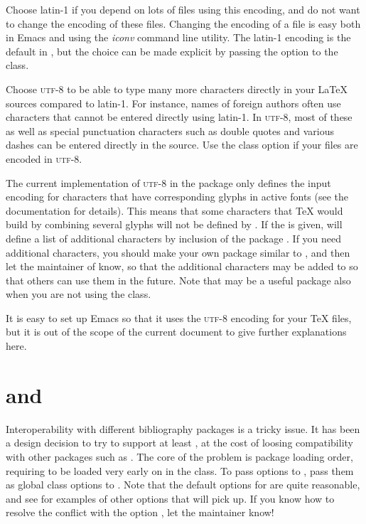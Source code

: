 Choose \mbox{latin-1} if you depend on lots of files using this encoding, and do not want to change the encoding of these files.  Changing the encoding of a file is easy both in Emacs and using the \emph{iconv} command line utility.  The \mbox{latin-1} encoding is the default in \rtthesis, but the choice can be made explicit by passing the  option to the class.

Choose \mbox{\textsc{utf}-8} to be able to type many more characters directly in your \LaTeX{} sources compared to \mbox{latin-1}.  For instance, names of foreign authors often use characters that cannot be entered directly using \mbox{latin-1}.  In \mbox{\textsc{utf}-8}, most of these as well as special punctuation characters such as double quotes and various dashes can be entered directly in the source.  Use the  class option if your files are encoded in \mbox{\textsc{utf}-8}.

The current implementation of \mbox{\textsc{utf}-8} in the  package only defines the input encoding for characters that have corresponding glyphs in active fonts (see the  documentation for details).  This means that some characters that \TeX{} would build by combining several glyphs will not be defined by .  If the  is given, \rtthesis will define a list of additional characters by inclusion of the package .  If you need additional characters, you should make your own package similar to , and then let the maintainer of \rtthesis know, so that the additional characters may be added to  so that others can use them in the future.  Note that  may be a useful package also when you are not using the \rtthesis class.

It is easy to set up Emacs so that it uses the \mbox{\textsc{utf}-8} encoding for your \TeX{} files, but it is out of the scope of the current document to give further explanations here.


\section{\rtthesis and }
%
Interoperability with different bibliography packages is a tricky issue.  It has been a design decision to try to support at least , at the cost of loosing compatibility with other packages such as .  The core of the problem is package loading order, requiring  to be loaded very early on in the class.  To pass options to , pass them as global class options to \rtthesis.  Note that the default options for  are quite reasonable, and see  for examples of other options that  will pick up.  If you know how to resolve the conflict with the  option , let the \rtthesis maintainer know!

